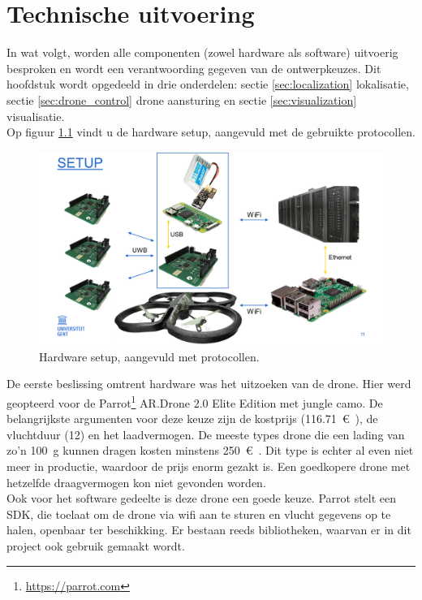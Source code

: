 \chapter{Technische uitvoering}
In wat volgt, worden alle componenten (zowel hardware als software) uitvoerig besproken en wordt een verantwoording gegeven van de ontwerpkeuzes.
Dit hoofdstuk wordt opgedeeld in drie onderdelen: sectie \ref{sec:localization} lokalisatie, sectie \ref{sec:drone_control} drone aansturing en sectie \ref{sec:visualization} visualisatie.\\

Op figuur \ref{fig:setup} vindt u de hardware setup, aangevuld met de gebruikte protocollen.\\
\begin{figure}[p]
	\centering
	\includegraphics[width=\textwidth]{Setup}
	\caption[Setup]{Hardware setup, aangevuld met protocollen.}
	\label{fig:setup}
\end{figure}

De eerste beslissing omtrent hardware was het uitzoeken van de drone.
Hier werd geopteerd voor de Parrot\footnote{\url{https://parrot.com}} AR.Drone 2.0 Elite Edition met jungle camo.
De belangrijkste argumenten voor deze keuze zijn de kostprijs (\SI{116.71}{\euro{}}), de vluchtduur (\SI{12}{\min}) en het laadvermogen. De meeste types drone die een lading van zo'n \SI{100}{\g} kunnen dragen kosten minstens \SI{250}{\euro{}}. Dit type is echter al even niet meer in productie, waardoor de prijs enorm gezakt is. Een goedkopere drone met hetzelfde draagvermogen kon niet gevonden worden.\\

Ook voor het software gedeelte is deze drone een goede keuze. Parrot stelt een SDK, die toelaat om de drone via wifi aan te sturen en vlucht gegevens op te halen, openbaar ter beschikking.
Er bestaan reeds bibliotheken, waarvan er in dit project ook gebruik gemaakt wordt.\\

